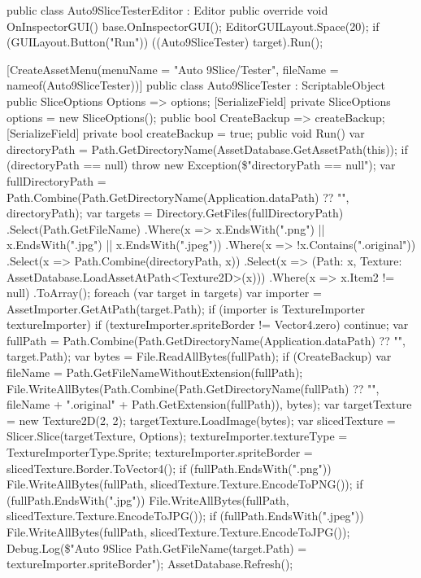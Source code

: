 \begin{mypython}
public class Auto9SliceTesterEditor : Editor
{
    public override void OnInspectorGUI()
    {
        base.OnInspectorGUI();
        EditorGUILayout.Space(20);
        if (GUILayout.Button("Run")) ((Auto9SliceTester) target).Run();
    }
}

[CreateAssetMenu(menuName = "Auto 9Slice/Tester", fileName = nameof(Auto9SliceTester))]
public class Auto9SliceTester : ScriptableObject
{
    public SliceOptions Options => options;
    [SerializeField] private SliceOptions options = new SliceOptions();
    public bool CreateBackup => createBackup;
    [SerializeField] private bool createBackup = true;
    public void Run()
    {
        var directoryPath = Path.GetDirectoryName(AssetDatabase.GetAssetPath(this));
        if (directoryPath == null) throw new Exception(\$"directoryPath == null");
        var fullDirectoryPath = Path.Combine(Path.GetDirectoryName(Application.dataPath) ?? "", directoryPath);
        var targets = Directory.GetFiles(fullDirectoryPath)
            .Select(Path.GetFileName)
            .Where(x => x.EndsWith(".png") || x.EndsWith(".jpg") || x.EndsWith(".jpeg"))
            .Where(x => !x.Contains(".original"))
            .Select(x => Path.Combine(directoryPath, x))
            .Select(x => (Path: x, Texture: AssetDatabase.LoadAssetAtPath<Texture2D>(x)))
            .Where(x => x.Item2 != null)
            .ToArray();
        foreach (var target in targets)
        {
            var importer = AssetImporter.GetAtPath(target.Path);
            if (importer is TextureImporter textureImporter)
            {
                if (textureImporter.spriteBorder != Vector4.zero) continue;
                var fullPath = Path.Combine(Path.GetDirectoryName(Application.dataPath) ?? "", target.Path);
                var bytes = File.ReadAllBytes(fullPath);
                if (CreateBackup)
                {
                    var fileName = Path.GetFileNameWithoutExtension(fullPath);
                    File.WriteAllBytes(Path.Combine(Path.GetDirectoryName(fullPath) ?? "", fileName + ".original" + Path.GetExtension(fullPath)), bytes);
                }
                var targetTexture = new Texture2D(2, 2);
                targetTexture.LoadImage(bytes);
                var slicedTexture = Slicer.Slice(targetTexture, Options);
                textureImporter.textureType = TextureImporterType.Sprite;
                textureImporter.spriteBorder = slicedTexture.Border.ToVector4();
                if (fullPath.EndsWith(".png")) File.WriteAllBytes(fullPath, slicedTexture.Texture.EncodeToPNG());
                if (fullPath.EndsWith(".jpg")) File.WriteAllBytes(fullPath, slicedTexture.Texture.EncodeToJPG());
                if (fullPath.EndsWith(".jpeg")) File.WriteAllBytes(fullPath, slicedTexture.Texture.EncodeToJPG());
                Debug.Log(\$"Auto 9Slice {Path.GetFileName(target.Path)} = {textureImporter.spriteBorder}");
            }
        }
        AssetDatabase.Refresh();
    }
}
\end{mypython}